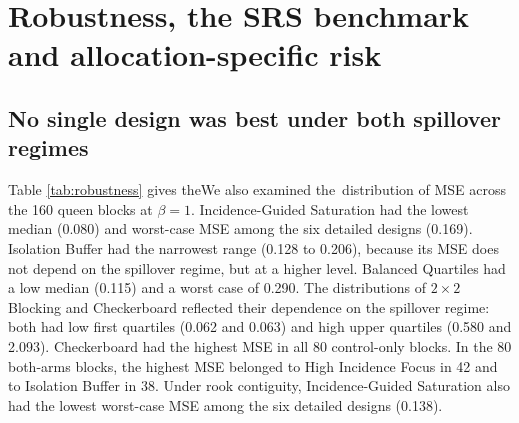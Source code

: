 \documentclass[11pt]{article}
\begin{document}
\FloatBarrier
\section{Robustness, the SRS benchmark and allocation-specific risk}\label{robustness-srs-allocation-risk}



\subsection{No single design was best under both spillover regimes}\label{robustness-across-blocks-and-the-recommended-design}


\iffullsi Table \ref{tab:robustness} gives the\else We also examined the\fi\ distribution of MSE across the 160
queen blocks at \(\beta = 1\). Incidence-Guided Saturation had
the lowest median (0.080) and worst-case MSE among the six detailed designs
(0.169). Isolation Buffer had the narrowest range (0.128 to 0.206),
because its MSE does not depend on the spillover regime, but at a higher
level. Balanced Quartiles had a low median (0.115) and a worst case of
0.290. The distributions of \(2\times2\) Blocking and Checkerboard
reflected their dependence on the spillover regime: both had low first
quartiles (0.062 and 0.063) and high upper quartiles (0.580 and 2.093).
Checkerboard had the highest MSE in all 80 control-only blocks. In the
80 both-arms blocks, the highest MSE belonged to High Incidence Focus in
42 and to Isolation Buffer in 38. Under rook contiguity,
Incidence-Guided Saturation also had the lowest worst-case MSE
among the six detailed designs (0.138).
\end{document}
